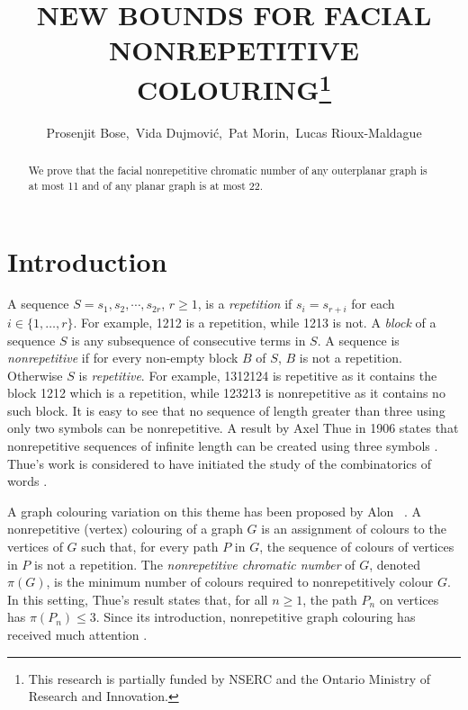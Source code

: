 \documentclass{patmorin}
\title{\MakeUppercase{New Bounds for Facial Nonrepetitive Colouring}\thanks{This research is partially funded by NSERC and the Ontario Ministry of Research and Innovation.}}
\author{Prosenjit Bose,\, Vida Dujmovi\'c,\, Pat Morin,\, Lucas Rioux-Maldague}
\begin{document}
\maketitle


\begin{abstract}
  We prove that the facial nonrepetitive chromatic number of any outerplanar graph is at most 11 and of any planar graph is at most 22.
\end{abstract}


\section{Introduction}

A sequence $S=s_1,s_2,\cdots,s_{2r}$, $r\ge 1$, is a \emph{repetition}
if $s_i=s_{r+i}$ for each $i\in\{1,\ldots,r\}$. For example, 1212
is a repetition, while 1213 is not. A \emph{block} of a sequence
$S$ is any subsequence of consecutive terms in $S$. A sequence is
\emph{nonrepetitive} if for every non-empty block $B$ of $S$, $B$
is not a repetition. Otherwise $S$ is \emph{repetitive}. For example,
1312124 is repetitive as it contains the block 1212 which is a repetition,
while 123213 is nonrepetitive as it contains no such block.  It is easy
to see that no sequence of length greater than three using only two
symbols can be nonrepetitive. A result by Axel Thue in 1906 states that
nonrepetitive sequences of infinite length can be created using three
symbols \cite{thue1906uber}. Thue's work is considered to have initiated
the study of the combinatorics of words \cite{allouche1999ubiquitous}.

A graph colouring variation on this theme has been proposed by Alon
\etal\ \cite{alon2002nonrepetitive}.  A nonrepetitive (vertex) colouring
of a graph $G$ is an assignment of colours to the vertices of $G$ such
that, for every path $P$ in $G$, the sequence of colours of vertices
in $P$ is not a repetition.  The \emph{nonrepetitive chromatic number}
of $G$, denoted $\pi(G)$, is the minimum number of colours required to
nonrepetitively colour $G$.  In this setting, Thue's result states that,
for all $n\ge 1$, the path $P_n$ on vertices has $\pi(P_n)\le 3$.
Since its introduction, nonrepetitive
graph colouring has received much attention \cite{barat2013facial,
barat2007square, barat2008note, brevsar2007nonrepetitive,
currie2002cycle18, dujmovic2012planarlogn, dujmovic2011nonrepetitive,
fiorenzi2011thue, gagol2016pathwidth, gonccalves2014entropy,
grytczuk2007nonrepetitivesurvey, grytczuk2007nonrepetitive,
grytczuk2013new, harant2012nonrepetitive, kozik2013nonrepetitive,
kundgen2008nonrepetitive, pezarski2009non, przybylo2013facial,
schreyer2012facial, schreyer2013total}.
\end{document}
